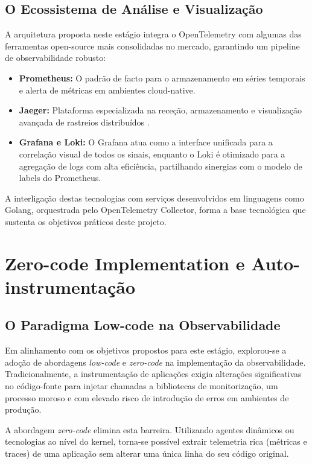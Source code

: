 \documentclass[a4paper,12pt,oneside]{article}
\begin{document}
    \subsection{O Ecossistema de Análise e Visualização}
    A arquitetura proposta neste estágio integra o OpenTelemetry com algumas das ferramentas open-source mais consolidadas no mercado, garantindo um pipeline de observabilidade robusto:

\begin{itemize}
    \item  \textbf{Prometheus:} O padrão de facto para o armazenamento em séries temporais e alerta de métricas em ambientes cloud-native.
    \item \textbf{Jaeger:} Plataforma especializada na receção, armazenamento e visualização avançada de rastreios distribuídos \cite{jaeger_docs}.
    \item \textbf{Grafana e Loki:} O Grafana atua como a interface unificada para a correlação visual de todos os sinais, enquanto o Loki é otimizado para a agregação de logs com alta eficiência, partilhando sinergias com o modelo de labels do Prometheus.
\end{itemize}
    A interligação destas tecnologias com serviços desenvolvidos em linguagens como Golang, orquestrada pelo OpenTelemetry Collector, forma a base tecnológica que sustenta os objetivos práticos deste projeto.

\section{Zero-code Implementation e Auto-instrumentação}
    \subsection{O Paradigma Low-code na Observabilidade}
        Em alinhamento com os objetivos propostos para este estágio, explorou-se a adoção de abordagens \textit{low-code} e \textit{zero-code} na implementação da observabilidade. Tradicionalmente, a instrumentação de aplicações exigia alterações significativas no código-fonte para injetar chamadas a bibliotecas de monitorização, um processo moroso e com elevado risco de introdução de erros em ambientes de produção.
        
        A abordagem \textit{zero-code} elimina esta barreira. Utilizando agentes dinâmicos ou tecnologias ao nível do kernel, torna-se possível extrair telemetria rica (métricas e traces) de uma aplicação sem alterar uma única linha do seu código original.
\end{document}
